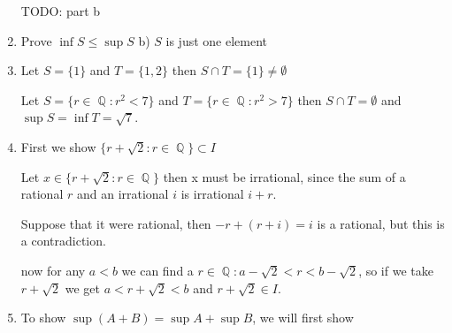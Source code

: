 \documentclass[10pt,a4paper]{article}
\DeclareMathOperator*{\Q}{\mathbb{Q}}
\begin{document}
\begin{enumerate}
        TODO: part b

    \item  Prove $ \inf S \leq \sup S $
        b) $S$ is just one element

    \item Let $S = \{ 1 \} $ and $T = \{1, 2\}$ then $S \cap T = \{ 1 \} \neq \emptyset$

        Let $S = \{ r \in \Q : r^2 < 7 \} $ and $T = \{ r \in \Q : r^2 > 7 \}$ then $S \cap T = \emptyset$ and $\sup S = \inf T = \sqrt7$.

    \item First we show $\{ r + \sqrt2 : r \in \Q\} \subset I$

        Let $x \in \{ r + \sqrt2 : r \in \Q\}$ then x must be irrational, since the sum of a rational $r$ and an irrational $i$ is irrational $i+r$.

        Suppose that it were rational, then $-r +(r+i) = i$ is a rational, but this is a contradiction.

        now for any $a < b$ we can find a $r \in \Q : a - \sqrt2 < r < b - \sqrt2$,  so if we take $r + \sqrt2$ we get $a < r+\sqrt2 < b$ and $r+\sqrt2 \in I$.

    \item  
        To show $\sup(A+B) = \sup A + \sup B $, we will first show 


\end{enumerate}
\end{document}
